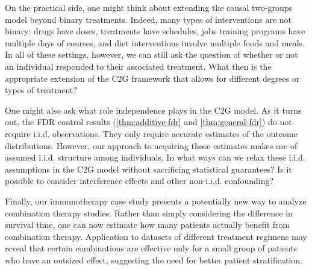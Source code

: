 On the practical side, one might think about extending the causal two-groups model beyond binary treatments. Indeed, many types of interventions are not binary: drugs have doses, treatments have schedules, jobs training programs have multiple days of courses, and diet interventions involve multiple foods and meals. In all of these settings, however, we can still ask the question of whether or not an individual responded to their associated treatment. What then is the appropriate extension of the C2G framework that allows for different degrees or types of treatment?

One might also ask what role independence plays in the C2G model. As it turns out, the FDR control results (\cref{thm:additive-fdr} and \cref{thm:general-fdr}) do not require i.i.d. observations. They only require accurate estimates of the outcome distributions. However, our approach to acquiring those estimates makes use of assumed i.i.d. structure among individuals. In what ways can we relax these i.i.d. assumptions in the C2G model without sacrificing statistical guarantees? Is it possible to consider interference effects and other non-i.i.d. confounding?

Finally, our immunotherapy case study presents a potentially new way to analyze combination therapy studies. Rather than simply considering the difference in survival time, one can now estimate how many patients actually benefit from combination therapy. Application to datasets of different treatment regimens may reveal that certain combinations are effective only for a small group of patients who have an outsized effect, suggesting the need for better patient stratification. %



